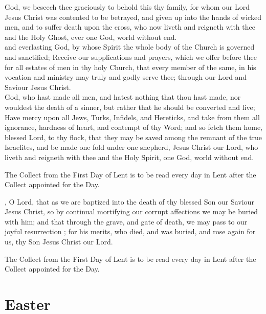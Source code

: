  God, we beseech thee graciously to behold this thy family, for whom our Lord Jesus Christ was contented to be betrayed, and given up into the hands of wicked men, and to suffer death upon the cross, who now liveth and reigneth with thee and the Holy Ghost, ever one God, world without end.
\\
 and everlasting God, by whose Spirit the whole body of the Church is governed and sanctified; Receive our supplications and prayers, which we offer before thee for all estates of men in thy holy Church, that every member of the same, in his vocation and ministry may truly and godly serve thee; through our Lord and Saviour Jesus Christ.
\\
 God, who hast made all men, and hatest nothing that thou hast made, nor wouldest the death of a sinner, but rather that he should be converted and live; Have mercy upon all Jews, Turks, Infidels, and Hereticks, and take from them all ignorance, hardness of heart, and contempt of thy Word; and so fetch them home, blessed Lord, to thy flock, that they may be saved among the remnant of the true Israelites, and be made one fold under one shepherd, Jesus Christ our Lord, who liveth and reigneth with thee and the Holy Spirit, one God, world without end.
\\
\begin{secrubric}
The Collect from the First Day of Lent is to be read every day in Lent after the Collect appointed for the Day.
\end{secrubric}

, O Lord, that as we are baptized into the death of thy blessed Son our Saviour Jesus Christ, so by continual mortifying our corrupt affections we may be buried with him; and that through the grave, and gate of death, we may pass to our joyful resurrection ; for his merits, who died, and was buried, and rose again for us, thy Son Jesus Christ our Lord.
\begin{secrubric}
The Collect from the First Day of Lent is to be read every day in Lent after the Collect appointed for the Day.
\end{secrubric}

\section{Easter}

